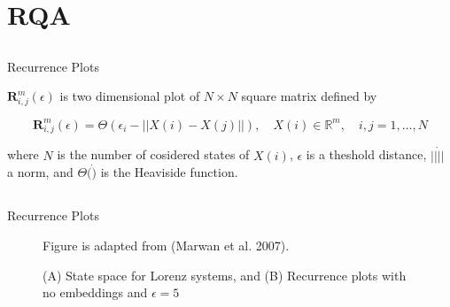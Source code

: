 
\section{RQA}

\subsection{}
{

\begin{frame}{Recurrence Plots}


$\mathbf{R}^{m}_{i,j} (\epsilon)$ is two dimensional plot of $N \times N$ square matrix
defined by

\begin{equation}
\mathbf{R}^{m}_{i,j} (\epsilon) = 
\Theta ( \epsilon_i - || X(i) - X(j) || ), \quad X(i) \in \mathbb{R}^m, \quad i,j=1,\dots,N
\end{equation}

where $N$ is the number of cosidered states of $X(i)$, 
$\epsilon$ is a theshold distance, 
$ || \dot ||$ a norm, and $\Theta( \dot )$ is the Heaviside function.

\end{frame}
}



\subsection{}
{

\begin{frame}{Recurrence Plots}
    \begin{figure}
		{Figure is adapted from (Marwan et al. 2007). 
		 }
	\caption{(A) State space for Lorenz systems, and 
		(B) Recurrence plots with no embeddings and $\epsilon=5$} 
   \end{figure}


\end{frame}
}


